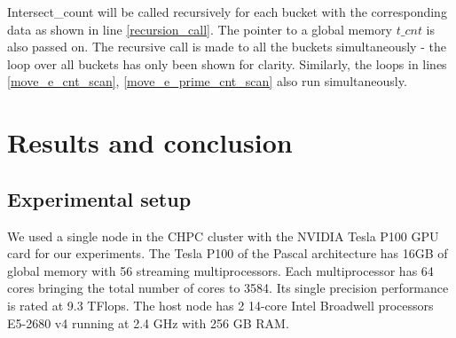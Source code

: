 \documentclass[conference]{IEEEtran}
\begin{document}
Intersect\_count will be called recursively for each bucket with the corresponding data as shown in line \ref{recursion_call}. The pointer to a global memory $t\_cnt$ is also passed on. The recursive call is made to all the buckets simultaneously - the loop over all buckets has only been shown for clarity. Similarly, the loops in lines \ref{move_e_cnt_scan}, \ref{move_e_prime_cnt_scan} also run simultaneously.



\section{Results and conclusion}
\subsection{Experimental setup}
We used a single node in the CHPC cluster with the NVIDIA Tesla P100 GPU card for our experiments. The Tesla P100 of the Pascal architecture has 16GB of global memory with 56 streaming multiprocessors. Each multiprocessor has 64 cores bringing the total number of cores to 3584. Its single precision performance is rated at 9.3 TFlops. The host node has 2 14-core Intel Broadwell processors E5-2680 v4 running at 2.4 GHz with 256 GB RAM.
\end{document}
